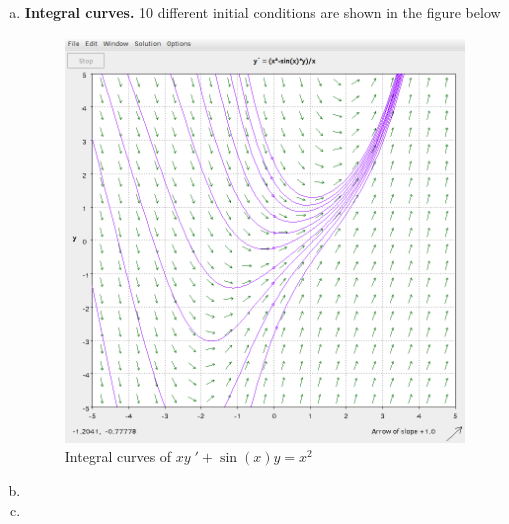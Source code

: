 \documentclass[a4paper,12pt]{article}
\begin{document}
\begin{enumerate}[I.]
\begin{enumerate}[a)]
    \item \textbf{Integral curves.} 10 different initial conditions are shown in the figure below
        \begin{figure}[H]
      \begin{center}
        \includegraphics[scale=.3]{32.png}
        \caption{Integral curves of $xy\;' + \sin(x)y = x^2$}
        \label{fig:6}
      \end{center}
    \end{figure}
    \item
    \item
  \end{enumerate}
\end{enumerate}
\end{document}
